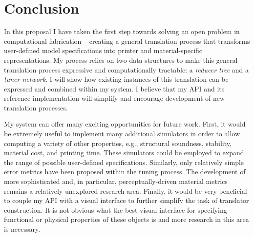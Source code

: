 \chapter{Conclusion}
In this proposal I have taken the first step towards solving an open problem in computational fabrication --  creating a general translation process that transforms user-defined model specifications into printer and material-specific representations.
My process relies on two data structures to make this general translation process expressive and computationally tractable: a \emph{reducer tree} and a \emph{tuner network}.
I will show how existing instances of this translation can be expressed and combined within my system.
I believe that my API and its reference implementation will simplify and encourage development of new translation processes.

My system can offer many exciting opportunities for future work.
First, it would be extremely useful to implement many additional simulators in order to allow computing a variety of other properties, e.g., structural soundness, stability, material cost, and printing time.
These simulators could be employed to expand the range of possible user-defined specifications.
Similarly, only relatively simple error metrics have been proposed within the tuning process.
The development of more sophisticated and, in particular, perceptually-driven material metrics remains a relatively unexplored research area.
Finally, it would be very beneficial to couple my API with a visual interface to further simplify the task of translator construction.
It is not obvious what the best visual interface for specifying functional or physical properties of these objects is and more research in this area is necessary.
